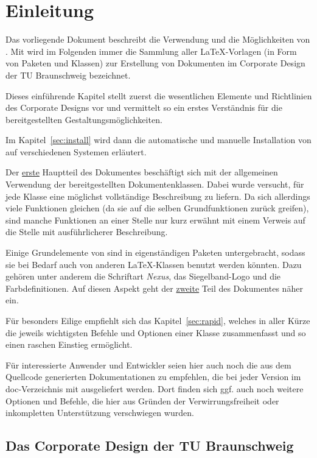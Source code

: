 \chapter{Einleitung}

Das vorliegende Dokument beschreibt die Verwendung und die Möglichkeiten von \tubslatex.
Mit \tubslatex wird im Folgenden immer die Sammlung aller \LaTeX-Vorlagen
(in Form von Paketen und Klassen) zur Erstellung von Dokumenten im
Corporate Design der TU Braunschweig bezeichnet.

Dieses einführende Kapitel stellt zuerst die wesentlichen Elemente und Richtlinien
des Corporate Designs vor und vermittelt so ein erstes Verständnis für
die bereitgestellten Gestaltungsmöglichkeiten.

Im Kapitel~\ref{sec:install} wird dann die automatische und manuelle
Installation von \tubslatex auf verschiedenen Systemen erläutert.

Der \hyperlink{part:user}{erste} Hauptteil des Dokumentes beschäftigt sich mit
der allgemeinen Verwendung der bereitgestellten Dokumentenklassen.
Dabei wurde versucht, für jede Klasse eine möglichst vollständige Beschreibung
zu liefern. Da sich allerdings viele Funktionen gleichen
(da sie auf die selben Grundfunktionen zurück greifen),
sind manche Funktionen an einer Stelle nur kurz erwähnt mit einem Verweis
auf die Stelle mit ausführlicherer Beschreibung.

Einige Grundelemente von \tubslatex sind in eigenständigen Paketen untergebracht,
sodass sie bei Bedarf auch von anderen \LaTeX-Klassen benutzt werden könnten.
Dazu gehören unter anderem die Schriftart \emph{Nexus}, das Siegelband-Logo
und die Farbdefinitionen.
Auf diesen Aspekt geht der \hyperlink{part:base}{zweite}
Teil des Dokumentes näher ein.

Für besonders Eilige empfiehlt sich das Kapitel~\ref{sec:rapid},
welches in aller Kürze die jeweils wichtigsten Befehle und Optionen einer Klasse
zusammenfasst und so einen raschen Einstieg ermöglicht.

Für interessierte Anwender und Entwickler seien hier auch noch die
aus dem Quellcode generierten Dokumentationen zu empfehlen, die bei jeder
Version im doc-Verzeichnis mit ausgeliefert werden. Dort finden sich
ggf. auch noch weitere Optionen und Befehle, die hier aus Gründen der
Verwirrungsfreiheit oder inkompletten Unterstützung verschwiegen wurden.

\clearpage
\section{Das Corporate Design der TU Braunschweig}\label{sec:intro:dascddertubs}

